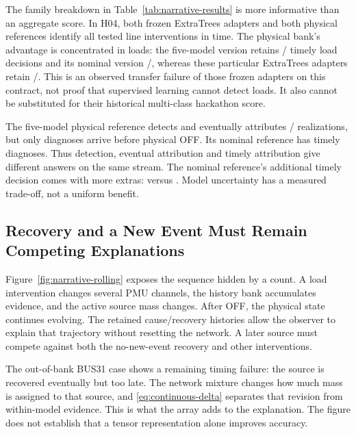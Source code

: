 

The family breakdown in Table~\ref{tab:narrative-results} is more informative than an aggregate score. In H04, both frozen ExtraTrees adapters and both physical references identify all tested line interventions in time. The physical bank's advantage is concentrated in loads: the five-model version retains \NarMixLoadTimely{}/\NarMixLoadTotal{} timely load decisions and its nominal version \NarNomLoadTimely{}/\NarNomLoadTotal{}, whereas these particular ExtraTrees adapters retain \NarETLoadTimely{}/\NarETLoadTotal{}. This is an observed transfer failure of those frozen adapters on this contract, not proof that supervised learning cannot detect loads. It also cannot be substituted for their historical multi-class hackathon score.

The five-model physical reference detects and eventually attributes \NarMixJoint{}/\NarMixEvents{} realizations, but only \ContMixTimely{} diagnoses arrive before physical OFF. Its nominal reference has \ContNomTimely{} timely diagnoses. Thus detection, eventual attribution and timely attribution give different answers on the same stream. The nominal reference's additional timely decision comes with more extras: \ContNomExtras{} versus \ContMixExtras{}. Model uncertainty has a measured trade-off, not a uniform benefit.

\subsection{Recovery and a New Event Must Remain Competing Explanations}

Figure~\ref{fig:narrative-rolling} exposes the sequence hidden by a count. A load intervention changes several PMU channels, the history bank accumulates evidence, and the active source mass changes. After OFF, the physical state continues evolving. The retained cause/recovery histories allow the observer to explain that trajectory without resetting the network. A later source must compete against both the no-new-event recovery and other interventions.



The out-of-bank BUS31 case shows a remaining timing failure: the source is recovered eventually but too late. The network mixture changes how much mass is assigned to that source, and \eqref{eq:continuous-delta} separates that revision from within-model evidence. This is what the array adds to the explanation. The figure does not establish that a tensor representation alone improves accuracy.

